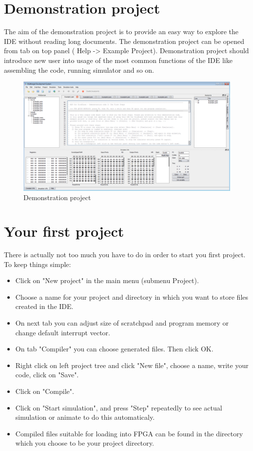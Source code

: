 
\section{Demonstration project}
    The aim of the demonstration project is to provide an easy way to explore the IDE without reading long documents.
    The demonstration project can be opened from tab on top panel ( Help -> Example Project).
    Demonstration project should introduce new user into usage of the most common functions of the IDE like assembling the code,
    running simulator and so on.
    \begin{figure}[h]
        \centering{}
        \includegraphics[width=\textwidth]{img/demonstration_1.png}
        \caption{Demonstration project}
    \end{figure}

\section{Your first project}
    There is actually not too much you have to do in order to start you first project. To keep things simple:
    \begin{itemize}
        \item Click on "New project" in the main menu (submenu Project).
        \item Choose a name for your project and directory in which you want to store files created in the IDE.
        \item On next tab you can adjust size of scratchpad and program memory or change default interrupt vector.
        \item On tab "Compiler" you can choose generated files. Then click OK.
        \item Right click on left project tree and click "New file", choose a name, write your code, click on "Save".
        \item Click on "Compile".
        \item Click on "Start simulation", and press "Step" repeatedly to see actual simulation or animate to do this automaticaly.
        \item Compiled files suitable for loading into FPGA can be found in the directory which you choose to be your project directory.
    \end{itemize}

